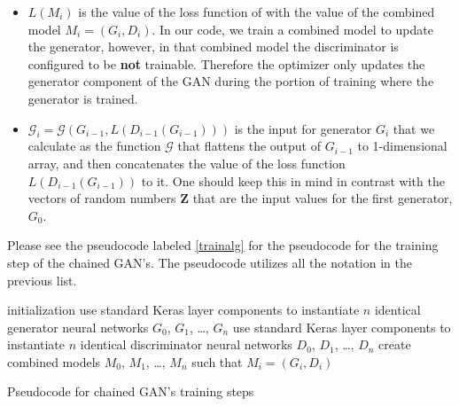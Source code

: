 \documentclass[conference]{IEEEtran}
\begin{document}
\begin{itemize}
\item $L\left(M_{i}\right)$ is the value of the loss function of with the value
of the combined model $M_{i}=\left(G_{i}, D_{i}\right)$.  In our code, we train a
combined model to update the generator, however, in that combined model the
discriminator is configured to be \textbf{not} trainable.  Therefore the
optimizer only updates the generator component of the GAN during the portion of
training where the generator is trained.
\item $\mathcal{G}_{i} = \mathcal{G}\left(G_{i-1},  
L\left(D_{i-1}\left(G_{i-1}\right)\right)\right)$ is
the input for generator $G_{i}$ that we calculate as the function
$\mathcal{G}$ that flattens the output of $G_{i-1}$ to 1-dimensional array,
and then concatenates the value of the loss function
$L\left(D_{i-1}\left(G_{i-1}\right)\right)$ to it. One should keep this in mind
in contrast with the vectors of random numbers $\mathbf{Z}$ that are the input
values for the first generator, $G_{0}$.
\end{itemize}

Please  see the pseudocode labeled \ref{trainalg} for the pseudocode for the 
training step of the chained GAN's.  The pseudocode utilizes all the notation
in the previous list.

\begin{algorithm}[htpb]
 initialization\;
 use standard Keras layer components to instantiate $n$ identical generator neural
 networks $G_{0}$, $G_{1}$, \ldots, $G_{n}$\;
 use standard Keras layer components to instantiate $n$ identical discriminator neural
networks $D_{0}$, $D_{1}$, \ldots, $D_{n}$\;
 create combined models $M_{0}$, $M_{1}$, \ldots, $M_{n}$ such that
$M_{i}=\left(G_{i},D_{i}\right)$\;
 \caption{Pseudocode for chained GAN's training steps}
\label{trainalg}

\end{algorithm}
\end{document}
